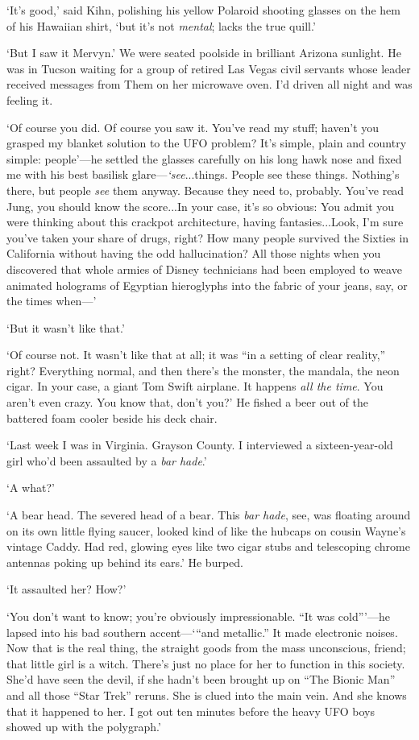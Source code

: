 `It's good,' said Kihn, polishing his yellow Polaroid shooting glasses on the hem of his Hawaiian shirt, `but it's not \textit{mental}; lacks the true quill.'

`But I saw it Mervyn.' We were seated poolside in brilliant Arizona sunlight. He was in Tucson waiting for a group of retired Las Vegas civil servants whose leader received messages from Them on her microwave oven. I'd driven all night and was feeling it.

`Of course you did. Of course you saw it. You've read my stuff; haven't you grasped my blanket solution to the UFO problem? It's simple, plain and country simple: people'---he settled the glasses carefully on his long hawk nose and fixed me with his best basilisk glare---\textit{`see}...things. People see these things. Nothing's there, but people \textit{see} them anyway. Because they need to, probably. You've read Jung, you should know the score...In your case, it's so obvious: You admit you were thinking about this crackpot architecture, having fantasies...Look, I'm sure you've taken your share of drugs, right? How many people survived the Sixties in California without having the odd hallucination? All those nights when you discovered that whole armies of Disney technicians had been employed to weave animated holograms of Egyptian hieroglyphs into the fabric of your jeans, say, or the times when---'

`But it wasn't like that.'

`Of course not. It wasn't like that at all; it was “in a setting of clear reality,” right? Everything normal, and then there's the monster, the mandala, the neon cigar. In your case, a giant Tom Swift airplane. It happens \textit{all the time}. You aren't even crazy. You know that, don't you?' He fished a beer out of the battered foam cooler beside his deck chair.

`Last week I was in Virginia. Grayson County. I interviewed a sixteen-year-old girl who'd been assaulted by a \textit{bar hade}.'

`A what?'

`A bear head. The severed head of a bear. This \textit{bar hade}, see, was floating around on its own little flying saucer, looked kind of like the hubcaps on cousin Wayne's vintage Caddy. Had red, glowing eyes like two cigar stubs and telescoping chrome antennas poking up behind its ears.' He burped.

`It assaulted her? How?'

`You don't want to know; you're obviously impressionable. “It was cold”'---he lapsed into his bad southern accent---`“and metallic.” It made electronic noises. Now that is the real thing, the straight goods from the mass unconscious, friend; that little girl is a witch. There's just no place for her to function in this society. She'd have seen the devil, if she hadn't been brought up on “The Bionic Man” and all those “Star Trek” reruns. She is clued into the main vein. And she knows that it happened to her. I got out ten minutes before the heavy UFO boys showed up with the polygraph.'

